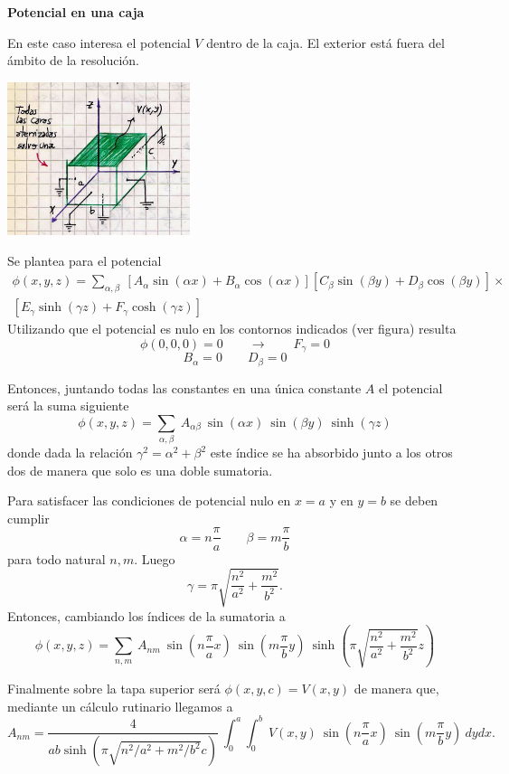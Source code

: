 \documentclass[10pt,oneside]{CBFT_book}
\begin{document}
\begin{ejemplo}{\bf Potencial en una caja}

En este caso interesa el potencial $V$ dentro de la caja. El exterior está fuera del ámbito
de la resolución.

\includegraphics[width=0.4\textwidth]{images/fig_ft1_potencial_caja.jpg}

Se plantea para el potencial 
\begin{multline*}
	\phi(x,y,z) =  \sum_{\alpha,\beta} \:
	\left[ A_\alpha\sin( \alpha x) + B_\alpha\cos( \alpha x) \right]
	\left[ C_\beta\sin( \beta y) + D_\beta\cos( \beta y) \right]\times \\
	\left[ E_\gamma\sinh( \gamma z) + F_\gamma\cosh( \gamma z) \right]
\end{multline*}
Utilizando que el potencial es nulo en los contornos indicados (ver figura) resulta
\[
	\phi(0,0,0) = 0 \qquad \longrightarrow \qquad F_\gamma = 0
\]
\[
	B_\alpha = 0 \qquad D_\beta = 0
\]

Entonces, juntando todas las constantes en una única constante $A$ el potencial será la 
suma siguiente
\[
	\phi(x,y,z) =  \sum_{\alpha,\beta} \:
	A_{\alpha\beta} \: \sin( \alpha x) \: \sin( \beta y) \: \sinh( \gamma z)
\]
donde dada la relación $\gamma^2 = \alpha^2 + \beta^2$ este índice se ha absorbido junto a los
otros dos de manera que solo es una doble sumatoria.

Para satisfacer las condiciones de potencial nulo en $x=a$ y en $y=b$ se deben cumplir
\[
	\alpha = n \frac{\pi}{a} \qquad \beta = m \frac{\pi}{b}
\]
para todo natural $n, m$. Luego
\[
	\gamma = \pi \sqrt{ \frac{n^2}{a^2} + \frac{m^2}{b^2} }.
\]
Entonces, cambiando los índices de la sumatoria a
\[
	\phi(x,y,z) =  \sum_{n,m} \:
	A_{nm} \: \sin\left( n \frac{\pi}{a} x \right) \: \sin\left( m \frac{\pi}{b} y \right)
	\: \sinh\left( \pi \sqrt{ \frac{n^2}{a^2} + \frac{m^2}{b^2} } z \right)
\]

Finalmente sobre la tapa superior será $\phi(x,y,c) = V(x,y)$ de manera que, mediante un
cálculo rutinario llegamos a
\[
	A_{nm} = \frac{4}{ a b \sinh( \pi \sqrt{ n^2/a^2 + m^2/b^2} c )} \:
	\int_0^a \int_0^b \: V( x,y) \: \sin\left( n \frac{\pi}{a} x \right) \: 
	\sin\left( m \frac{\pi}{b} y \right) \: dy dx.
\]

\end{ejemplo}
\end{document}
